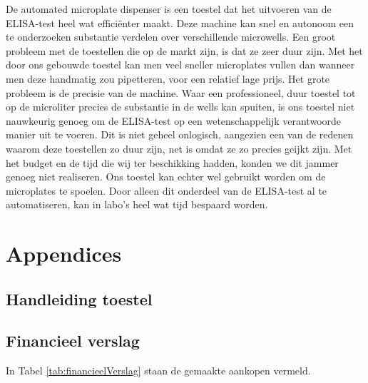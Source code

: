 \documentclass[a4paper,twoside,kulak]{kulakreport} %
\begin{document}
De automated microplate dispenser is een toestel dat het uitvoeren van de ELISA-test heel wat efficiënter maakt. Deze machine kan snel en autonoom een te onderzoeken substantie verdelen over verschillende microwells. Een groot probleem met de toestellen die op de markt zijn, is dat ze zeer duur zijn. Met het door ons gebouwde toestel kan men veel sneller microplates vullen dan wanneer men deze handmatig zou pipetteren, voor een relatief lage prijs. Het grote probleem is de precisie van de machine. Waar een professioneel, duur toestel tot op de microliter precies de substantie in de wells kan spuiten, is ons toestel niet nauwkeurig genoeg om de ELISA-test op een wetenschappelijk verantwoorde manier uit te voeren. Dit is niet geheel onlogisch, aangezien een van de redenen waarom deze toestellen zo duur zijn, net is omdat ze zo precies geijkt zijn. Met het budget en de tijd die wij ter beschikking hadden, konden we dit jammer genoeg niet realiseren. Ons toestel kan echter wel gebruikt worden om de microplates te spoelen. Door alleen dit onderdeel van de ELISA-test al te automatiseren, kan in labo's heel wat tijd bespaard worden.

\clearpage
\nocite{wikipedia,LabX}



\chapter*{Appendices}

\section*{Handleiding toestel}

\section*{Financieel verslag}
\label{Appendix: Financieel verslag}

In Tabel \ref{tab:financieelVerslag} staan de gemaakte aankopen vermeld. 




		
\end{document}
